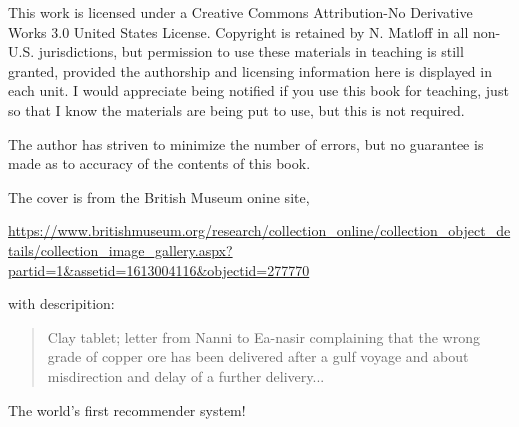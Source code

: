 This work is licensed under a Creative Commons Attribution-No Derivative
Works 3.0 United States License. Copyright is retained by N. Matloff in
all non-U.S. jurisdictions, but permission to use these materials in
teaching is still granted, provided the authorship and licensing
information here is displayed in each unit. I would appreciate being
notified if you use this book for teaching, just so that I know the
materials are being put to use, but this is not required.

The author has striven to minimize the number of errors, but no
guarantee is made as to accuracy of the contents of this book.
 
The cover is from the British Museum onine site,

\url{https://www.britishmuseum.org/research/collection_online/collection_object_details/collection_image_gallery.aspx?partid=1&assetid=1613004116&objectid=277770}

with descripition:

\begin{quote}
Clay tablet; letter from Nanni to Ea-nasir complaining that the wrong
grade of copper ore has been delivered after a gulf voyage and about
misdirection and delay of a further delivery...
\end{quote}

The world's first recommender system!


